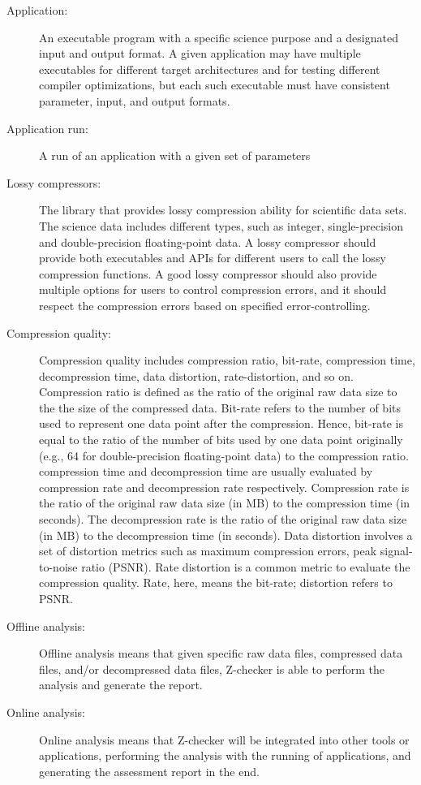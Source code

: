 \begin{description}

\item[Application:] An executable program with a specific science purpose and a
designated input and output format. A given application may have multiple
executables for different target architectures and for testing different
compiler optimizations, but each such executable must have consistent
parameter, input, and output formats.

\item[Application run:] A run of an application with a given set of parameters

\item[Lossy compressors:] The library that provides lossy compression ability for scientific data sets. The science data includes different types, such as integer, single-precision and double-precision floating-point data. A lossy compressor should provide both executables and APIs for different users to call the lossy compression functions. A good lossy compressor should also provide multiple options for users to control compression errors, and it should respect the compression errors based on specified error-controlling. 

\item[Compression quality:] Compression quality includes compression ratio, bit-rate, compression time, decompression time, data distortion, rate-distortion, and so on. Compression ratio is defined as the ratio of the original raw data size to the the size of the compressed data. Bit-rate refers to the number of bits used to represent one data point after the compression. Hence, bit-rate is equal to the ratio of the number of bits used by one data point originally (e.g., 64 for double-precision floating-point data) to the compression ratio. compression time and decompression time are usually evaluated by compression rate and decompression rate respectively. Compression rate is the ratio of the original raw data size (in MB) to the compression time (in seconds). The decompression rate is the ratio of the original raw data size (in MB) to the decompression time (in seconds). Data distortion involves a set of distortion metrics such as maximum compression errors, peak signal-to-noise ratio (PSNR). Rate distortion is a common metric to evaluate the compression quality. Rate, here, means the bit-rate; distortion refers to PSNR. 


\item[Offline analysis:] Offline analysis means that given specific raw data files, compressed data files, and/or decompressed data files, Z-checker is able to perform the analysis and generate the report. 

\item[Online analysis:] Online analysis means that Z-checker will be integrated into other tools or applications, performing the analysis with the running of applications, and generating the assessment report in the end. 

\end{description}

